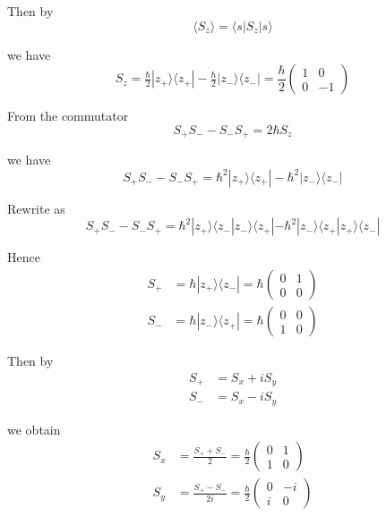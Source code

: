 Then by
\begin{equation*}
\langle S_z\rangle=\langle s|S_z|s\rangle
\end{equation*}

we have
\begin{equation*}
S_z=\tfrac{\hbar}{2}|z_+\rangle\langle z_+|-\tfrac{\hbar}{2}|z_-\rangle\langle z_-|
=\frac{\hbar}{2}\begin{pmatrix}1&0\\0&-1\end{pmatrix}
\end{equation*}

From the commutator
\begin{equation*}
S_+S_--S_-S_+=2\hbar S_z
\end{equation*}

we have
\begin{equation*}
S_+S_--S_-S_+
=\hbar^2|z_+\rangle\langle z_+|-\hbar^2|z_-\rangle\langle z_-|
\end{equation*}

Rewrite as
\begin{equation*}
S_+S_--S_-S_+
=\hbar^2|z_+\rangle\langle z_-|z_-\rangle\langle z_+|
-\hbar^2|z_-\rangle\langle z_+|z_+\rangle\langle z_-|
\end{equation*}

Hence
\begin{align*}
S_+&=\hbar|z_+\rangle\langle z_-|=\hbar\begin{pmatrix}0&1\\0&0\end{pmatrix}
\\
S_-&=\hbar|z_-\rangle\langle z_+|=\hbar\begin{pmatrix}0&0\\1&0\end{pmatrix}
\end{align*}

Then by
\begin{align*}
S_+&=S_x+iS_y
\\
S_-&=S_x-iS_y
\end{align*}

we obtain
\begin{align*}
S_x&=\frac{S_++S_-}{2}=\frac{\hbar}{2}\begin{pmatrix}0&1\\1&0\end{pmatrix}
\\
S_y&=\frac{S_+-S_-}{2i}=\frac{\hbar}{2}\begin{pmatrix}0&-i\\i&0\end{pmatrix}
\end{align*}

